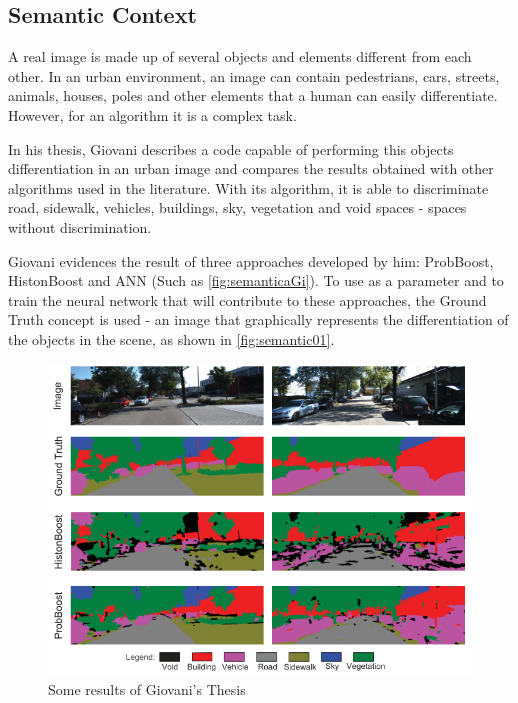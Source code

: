 \subsection{Semantic Context}

    A real image is made up of several objects and elements different from each other. In an urban environment, an image can contain pedestrians, cars, streets, animals, houses, poles and other elements that a human can easily differentiate. However, for an algorithm it is a complex task.

    In his thesis, Giovani \cite{giovaniThesis} describes a code capable of performing this objects differentiation in an urban image and compares the results obtained with other algorithms used in the literature. With its algorithm, it is able to discriminate road, sidewalk, vehicles, buildings, sky, vegetation and void spaces - spaces without discrimination.

    Giovani \cite{giovaniThesis} evidences the result of three approaches developed by him: ProbBoost, HistonBoost and ANN (Such as \autoref{fig:semanticaGi}). To use as a parameter and to train the neural network that will contribute to these approaches, the Ground Truth concept is used - an image that graphically represents the differentiation of the objects in the scene, as shown in \autoref{fig:semantic01}.

    \begin{figure}[H]
     \caption{\label{fig:semanticaGi}
Some results of Giovani's Thesis}
     \begin{center}
        \includegraphics[width=1\textwidth]{images/semanticaGi.png}
     \end{center}
    \end{figure}    

